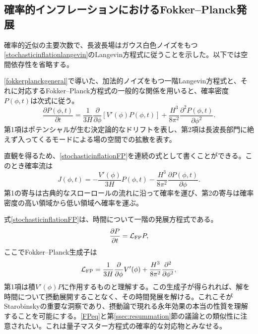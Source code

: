 \documentclass[a4paper,11pt,oneside]{article}
\theoremstyle{definition}
\numberwithin{equation}{section}
\begin{document}
\subsection{確率的インフレーションにおけるFokker--Planck発展}
\label{sec:stochastic-fokker-planck}



確率的近似の主要次数で、長波長場はガウス白色ノイズをもつ\eqref{stochasticinflationlangevin}のLangevin方程式に従うことを示した。以下では空間依存性を省略する。



\eqref{fokkerplanckgeneral}で導いた、加法的ノイズをもつ一階Langevin方程式と、それに対応するFokker--Planck方程式の一般的な関係を用いると、確率密度\(P(\phi,t)\)は次式に従う。
\begin{equation}
\frac{\partial P(\phi,t)}{\partial t}
=
\frac{1}{3H}
\frac{\partial}{\partial\phi}
\left[
V'(\phi)P(\phi,t)
\right]
+
\frac{H^{3}}{8\pi^{2}}
\frac{\partial^{2}P(\phi,t)}{\partial\phi^{2}}.
\label{stochasticinflationFP}
\end{equation}
第1項はポテンシャルが生む決定論的なドリフトを表し、第2項は長波長部門に絶えず入ってくるモードによる場の空間での拡散を表す。



直観を得るため、\eqref{stochasticinflationFP}を連続の式として書くことができる。このとき確率流は
\begin{equation}
J(\phi,t)
=
-
\frac{V'(\phi)}{3H}
P(\phi,t)
-
\frac{H^{3}}{8\pi^{2}}
\frac{\partial P(\phi,t)}{\partial\phi}.
\label{FPcurrent}
\end{equation}
第1の寄与は古典的なスローロールの流れに沿って確率を運び、第2の寄与は確率密度の高い領域から低い領域へ確率を運ぶ。



式\eqref{stochasticinflationFP}は、時間について一階の発展方程式である。
\begin{equation}
\frac{\partial P}{\partial t}
=
\mathcal{L}_{\rm FP}P,
\end{equation}
ここでFokker--Planck生成子は
\begin{equation}\label{FPeq}
\mathcal{L}_{\rm FP}
=
\frac{1}{3H}
\frac{\partial}{\partial\phi}
V'(\phi)
+
\frac{H^{3}}{8\pi^{2}}
\frac{\partial^{2}}{\partial\phi^{2}},
\end{equation}
第1項は積\(V'(\phi)P\)に作用するものと理解する。この生成子が得られれば、解を時間について摂動展開することなく、その時間発展を解ける。これこそがStarobinskyの重要な洞察であり、摂動論で現れる永年効果の本当の性質を理解することを可能にする。\eqref{FPeq}と第\ref{ssec:resummation}節の議論との類似性に注意されたい。これは量子マスター方程式の確率的な対応物とみなせる。
\end{document}
